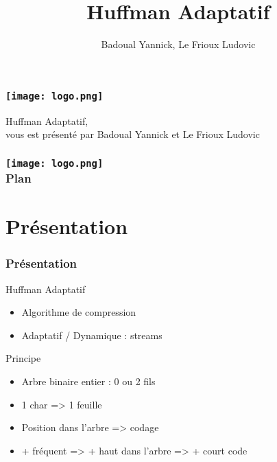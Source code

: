 \documentclass[12pt,francais]{beamer}
\institute{UPMC}
\title{Huffman Adaptatif}
\author{Badoual Yannick, Le Frioux Ludovic}
\begin{document}
\begin{frame}
        \frametitle{\texttt{[image: logo.png]}}
        \begin{center}
                Huffman Adaptatif,\\
                \vspace{1cm}
                vous est pr\'esent\'e par Badoual Yannick et Le Frioux Ludovic
        \end{center}
\end{frame}

\begin{frame}
\frametitle{\texttt{[image: logo.png]}\\Plan}
  \tableofcontents
\end{frame}


\section{Pr\'esentation}
\begin{frame}
  \frametitle{Pr\'esentation}
  \begin{block}{Huffman Adaptatif}
    \begin{itemize}
      \item Algorithme de compression
      \item Adaptatif / Dynamique : streams
    \end{itemize}
  \end{block}
  \begin{block}{Principe}
    \begin{itemize}
      \item Arbre binaire entier : 0 ou 2 fils
      \item 1 char => 1 feuille
      \item Position dans l'arbre => codage
      \item + fréquent => + haut dans l'arbre => + court code
    \end{itemize}
  \end{block}
\end{frame}
\end{document}
